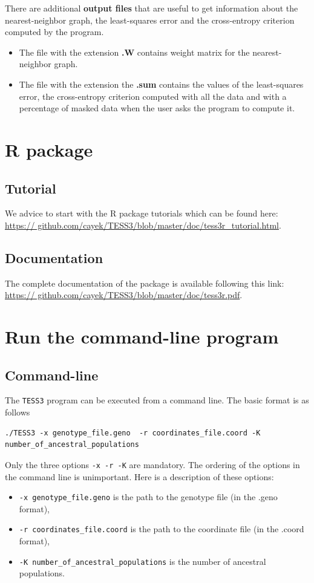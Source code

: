 \documentclass[10pt,a4paper]{article}
\begin{document}
There are additional {\bf output files} that are useful to get information about 
the nearest-neighbor graph, the least-squares error and the cross-entropy 
criterion computed by the program.

\begin{itemize}
\item The file with the extension {\bf .W} contains weight matrix for the 
nearest-neighbor graph.
\item The file with the extension the {\bf .sum} contains the values of the 
least-squares error, the cross-entropy criterion computed with all the data and 
with a percentage of masked data when the user asks the program to compute it.
\end{itemize}

\section{R package}

\subsection{Tutorial}
We advice to start with the R package tutorials which can be found here: \url{https://
github.com/cayek/TESS3/blob/master/doc/tess3r_tutorial.html}.

\subsection{Documentation}
The complete documentation of the package is available following this link: \url{https://
github.com/cayek/TESS3/blob/master/doc/tess3r.pdf}.


\section{Run the command-line program}
\subsection{Command-line}
The {\tt TESS3} program can be executed from a command line. The basic format is 
as follows
\begin{Verbatim}[frame=single]
./TESS3 -x genotype_file.geno  -r coordinates_file.coord -K 
number_of_ancestral_populations
\end{Verbatim}

\noindent
Only the three options {\tt -x -r -K}  are mandatory. The ordering of the 
options in the command line is unimportant. Here is a description of these 
options:
\begin{itemize}
\item \verb|-x genotype_file.geno| is the path to the genotype file (in the 
.geno format),
\item \verb|-r coordinates_file.coord| is the path to the coordinate file (in 
the .coord format),
\item \verb|-K number_of_ancestral_populations| is the number of ancestral 
populations.
\end{itemize}
\end{document}
